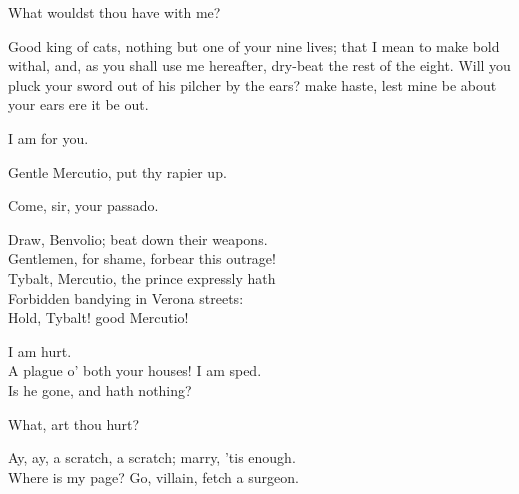 \begin{speech}
What wouldst thou have with me? \\
\end{speech}
\begin{speech}
Good king of cats, nothing but one
of your nine lives; that I mean to make bold
withal, and, as you shall use me hereafter,
dry-beat the rest of the eight. Will you pluck
your sword out of his pilcher by the ears?
make haste, lest mine be about your ears ere
it be out.
\end{speech}
\begin{speech}
I am for you.  \\
\end{speech}
\begin{speech}
Gentle Mercutio, put thy rapier up. \\
\end{speech}
\begin{speech}
Come, sir, your passado.  \\

\end{speech}
\begin{speech}
Draw, Benvolio; beat down their weapons. \\
Gentlemen, for shame, forbear this outrage! \\
Tybalt, Mercutio, the prince expressly hath \\
Forbidden bandying in Verona streets: \\
Hold, Tybalt! good Mercutio!  \\
\end{speech}
\begin{speech}
I am hurt. \\
A plague o' both your houses! I am sped. \\
Is he gone, and hath nothing? \\
\end{speech}
\begin{speech}
What, art thou hurt? \\
\end{speech}
\begin{speech}
Ay, ay, a scratch, a scratch; marry, 'tis enough.
\\
Where is my page?   Go, villain, fetch a surgeon.  \\
\end{speech}
